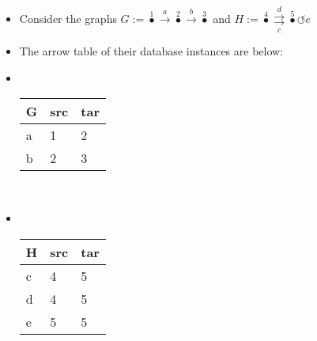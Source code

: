 
\begin{itemize}
    \item  Consider the graphs $G:=\boxed{\overset{1}\bullet \xrightarrow{a} \overset{2}\bullet \xrightarrow{b}\overset{3}\bullet}$ and $H:=\boxed{\overset{4}\bullet \overset{d}{\underset{c}{\rightrightarrows}}\overset{5}\bullet\circlearrowleft e}$
    \item The arrow table of their database instances are below:
    \item  \,\begin{minipage}{0.48\textwidth}

            \begin{tabular}{|l|l|l|}
              \hline
              G & src & tar \\ \hline
              a & 1   & 2   \\ \hline
              b & 2   & 3   \\ \hline
            \end{tabular}
          \end{minipage}\,
    \item    \,\begin{minipage}{0.48\textwidth}

            \begin{tabular}{|l|l|l|}
              \hline
              H & src & tar \\ \hline
              c & 4   & 5   \\ \hline
              d & 4   & 5   \\ \hline
              e & 5   & 5   \\ \hline
            \end{tabular}
          \end{minipage}\,

  \end{itemize}
